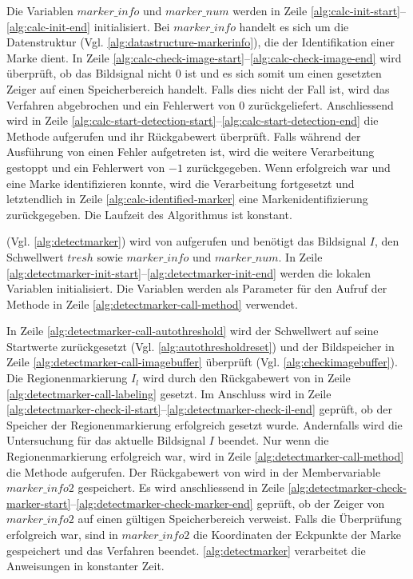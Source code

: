 Die Variablen $\mathit{marker\_info}$ und $\mathit{marker\_num}$ werden in Zeile
 \ref{alg:calc-init-start}--\ref{alg:calc-init-end} initialisiert. Bei $\mathit{marker\_info}$ handelt es sich um die
 Datenstruktur  (Vgl. \autoref{alg:datastructure-markerinfo}), die der Identifikation einer Marke
 dient. In Zeile \ref{alg:calc-check-image-start}--\ref{alg:calc-check-image-end} wird überprüft, ob das Bildsignal
 nicht $0$ ist und es sich somit um einen gesetzten Zeiger auf einen Speicherbereich handelt. Falls dies nicht der Fall
 ist, wird das Verfahren abgebrochen und ein Fehlerwert von $0$ zurückgeliefert. Anschliessend wird in Zeile
 \ref{alg:calc-start-detection-start}--\ref{alg:calc-start-detection-end} die Methode 
 aufgerufen und ihr Rückgabewert überprüft. Falls während der Ausführung von  einen Fehler
 aufgetreten ist, wird die weitere Verarbeitung gestoppt und ein Fehlerwert von $-1$ zurückgegeben. Wenn
  erfolgreich war und eine Marke identifizieren konnte, wird die Verarbeitung fortgesetzt und
 letztendlich in Zeile \ref{alg:calc-identified-marker} eine Markenidentifizierung zurückgegeben. Die Laufzeit des
 Algorithmus ist konstant.

 (Vgl. \autoref{alg:detectmarker}) wird von  aufgerufen und benötigt das
 Bildsignal $I$, den Schwellwert $\mathit{tresh}$ sowie $\mathit{marker\_info}$ und $\mathit{marker\_num}$. In Zeile
 \ref{alg:detectmarker-init-start}--\ref{alg:detectmarker-init-end} werden die lokalen Variablen initialisiert. Die
 Variablen werden als Parameter für den Aufruf der Methode  in Zeile
 \ref{alg:detectmarker-call-method} verwendet.



In Zeile \ref{alg:detectmarker-call-autothreshold} wird der Schwellwert auf seine Startwerte zurückgesetzt
 (Vgl. \autoref{alg:autothresholdreset}) und der Bildspeicher in Zeile \ref{alg:detectmarker-call-imagebuffer}
 überprüft (Vgl. \autoref{alg:checkimagebuffer}). Die Regionenmarkierung $I_l$ wird durch den Rückgabewert von
  in Zeile \ref{alg:detectmarker-call-labeling} gesetzt. Im Anschluss wird in Zeile
 \ref{alg:detectmarker-check-il-start}--\ref{alg:detectmarker-check-il-end} geprüft, ob der Speicher der
 Regionenmarkierung erfolgreich gesetzt wurde. Andernfalls wird die Untersuchung für das aktuelle Bildsignal $I$
 beendet. Nur wenn die Regionenmarkierung erfolgreich war, wird in Zeile \ref{alg:detectmarker-call-method} die Methode
  aufgerufen. Der Rückgabewert von  wird in der Membervariable
 $\mathit{marker\_info2}$ gespeichert. Es wird anschliessend in Zeile
 \ref{alg:detectmarker-check-marker-start}--\ref{alg:detectmarker-check-marker-end} geprüft, ob der Zeiger von
 $\mathit{marker\_info2}$ auf einen gültigen Speicherbereich verweist. Falls die Überprüfung erfolgreich war, sind in
 $\mathit{marker\_info2}$ die Koordinaten der Eckpunkte der Marke gespeichert und das Verfahren beendet.
 \autoref{alg:detectmarker} verarbeitet die Anweisungen in konstanter Zeit.


